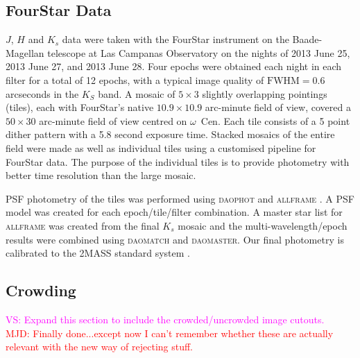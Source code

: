 \documentclass[a4paper,fleqn,usenatbib]{mnras}
\newcommand{\ocen}{$\omega$~Cen\xspace}
\providecommand{\vscomment}[1]{{\textcolor{magenta}{{VS: #1}}}\xspace}
\providecommand{\mjdcomment}[1]{{\textcolor{red}{{MJD: #1}}}\xspace}
\begin{document}
\subsection{FourStar Data}
\label{sec:fourstar_reduction}

$J$, $H$ and $K_s$ data were taken with the FourStar instrument on the Baade-Magellan telescope at Las Campanas Observatory \citep{2013PASP..125..654P} on the nights of 2013 June 25, 2013 June 27, and 2013 June 28. Four epochs were obtained each night in each filter for a total of 12 epochs, with a typical image quality of $\text{FWHM} =0.6$ arcseconds in the $K_{S}$ band. A mosaic of $5\times3$ slightly overlapping pointings (tiles), each with FourStar's native $10.9 \times 10.9$ arc-minute field of view, covered a $50\times30$ arc-minute field of view centred on \ocen. Each tile consists of a 5 point dither pattern with a 5.8 second exposure time. Stacked mosaics of the entire field were made as well as individual tiles using a customised pipeline for FourStar data. The purpose of the individual tiles is to provide photometry with better time resolution than the large mosaic. 

PSF photometry of the tiles was performed using \textsc{daophot} and \textsc{allframe} \citep{1987PASP...99..191S, 1994PASP..106..250S}. A PSF model was created for each epoch/tile/filter combination. A master star list for \textsc{allframe} was created from the final $K_s$ mosaic and the multi-wavelength/epoch results were combined using \textsc{daomatch} and \textsc{daomaster}. Our final photometry is calibrated to the 2MASS standard system \citep{2006AJ....131.1163S}. 

\subsection{Crowding}
\label{sec:crowding}

\vscomment{Expand this section to include the crowded/uncrowded image cutouts.}\\
\mjdcomment{Finally done...except now I can't remember whether these are actually relevant with the new way of rejecting stuff.}\\
\end{document}

